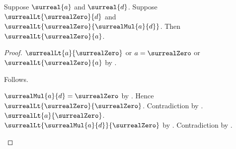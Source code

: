 \begin{lemma}\label{surreal_mul_positive_right_positive_elim}
    Suppose $\surreal{a}$ and $\surreal{d}$.
    Suppose $\surrealLt{\surrealZero}{d}$ and
        $\surrealLt{\surrealZero}{\surrealMul{a}{d}}$.
    Then $\surrealLt{\surrealZero}{a}$.
\end{lemma}
\begin{proof}
    $\surrealLt{a}{\surrealZero}$ or $a=\surrealZero$ or
        $\surrealLt{\surrealZero}{a}$
        by .
    \begin{byCase}
            Follows.
            \begin{byCase}
                    $\surrealMul{a}{d}=\surrealZero$
                        by .
                    Hence $\surrealLt{\surrealZero}{\surrealZero}$.
                    Contradiction by
                        .
                    $\surrealLt{a}{\surrealZero}$.
                    $\surrealLt{\surrealMul{a}{d}}{\surrealZero}$
                        by .
                    Contradiction by
                        .
            \end{byCase}
    \end{byCase}
\end{proof}

